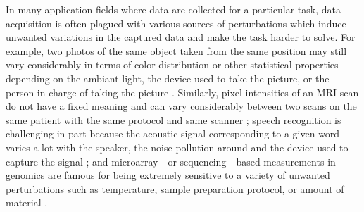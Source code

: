 \documentclass{article}
\begin{document}
In many application fields where data are collected for a particular task, data acquisition is often plagued with various sources of perturbations which induce unwanted variations in the captured data and make the task harder to solve. For example, two photos of the same object taken from the same position may still vary considerably in terms of color distribution or other statistical properties depending on the ambiant light, the device used to take the picture, or the person in charge of taking the picture \cite{Gonzalez2008Digital}. Similarly, pixel intensities of an MRI scan do not have a fixed meaning and can vary considerably between two scans on the same patient with the same protocol and same scanner \cite{Shinohara2014Statistical}; speech recognition is challenging in part because the acoustic signal corresponding to a given word varies a lot with the speaker, the noise pollution around and the device used to capture the signal \cite{Hilger2006Quantile}; and microarray - or sequencing - based measurements in genomics are famous for being extremely sensitive to a variety of unwanted perturbations such as temperature, sample preparation protocol, or amount of material \cite{Bullard2010Evaluation}.
\end{document}
